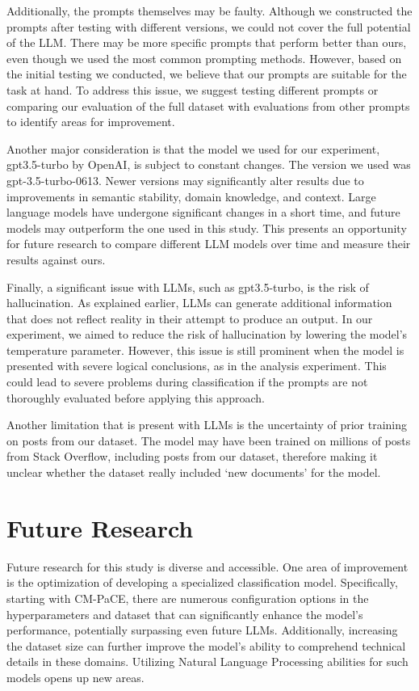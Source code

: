 \documentclass[english,bachelor]{swsLeipzig}
\begin{document}
Additionally, the prompts themselves may be faulty. Although we constructed the prompts after testing 
with different versions, we could not cover the full potential of the LLM. There may be more specific prompts that perform better than ours, even though we used the most common prompting methods. However, based on the initial testing we conducted, we believe that our prompts are suitable for the task at hand. To address this issue, we suggest testing different prompts or comparing our evaluation of the full dataset with evaluations from other prompts to identify areas for improvement.

Another major consideration is that the model we used for our experiment, gpt3.5-turbo by OpenAI, is 
subject to constant changes. The version we used was gpt-3.5-turbo-0613. Newer versions may significantly alter results due to improvements in semantic stability, domain knowledge, and context. Large language models have undergone significant changes in a short time, and future models may outperform the one used in this study. This presents an opportunity for future research to compare different LLM models over time and measure their results against ours.

Finally, a significant issue with LLMs, such as gpt3.5-turbo, is the risk of hallucination. As explained 
earlier, LLMs can generate additional information that does not reflect reality in their attempt to produce an output. In our experiment, we aimed to reduce the risk of hallucination by lowering the model's temperature parameter. However, this issue is still prominent when the model is presented with severe logical conclusions, as in the analysis experiment. This could lead to severe problems during classification if the prompts are not thoroughly evaluated before applying this approach.

Another limitation that is present with LLMs is the uncertainty of prior training on posts from our dataset. The model may have been trained on millions of posts from Stack Overflow, including posts from our dataset, therefore making it unclear whether the dataset really included `new documents' for the model. 

\section{Future Research}

Future research for this study is diverse and accessible. One area of improvement is the optimization 
of developing a specialized classification model. Specifically, starting with CM-PaCE, there are numerous configuration options in the hyperparameters and dataset that can significantly enhance the model's performance, potentially surpassing even future LLMs. Additionally, increasing the dataset size can further improve the model's ability to comprehend technical details in these domains. Utilizing Natural Language Processing abilities for such models opens up new areas. 
\end{document}
